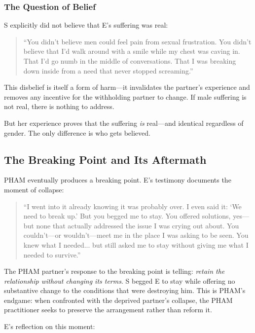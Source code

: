 \documentclass[12pt, letterpaper]{article}
\begin{document}
\subsubsection{The Question of Belief}

S explicitly did not believe that E's suffering was real:

\begin{quote}
``You didn't believe men could feel pain from sexual frustration. You didn't believe that I'd walk around with a smile while my chest was caving in. That I'd go numb in the middle of conversations. That I was breaking down inside from a need that never stopped screaming.''
\end{quote}

This disbelief is itself a form of harm---it invalidates the partner's experience and removes any incentive for the withholding partner to change. If male suffering is not real, there is nothing to address.

But her experience proves that the suffering \textit{is} real---and identical regardless of gender. The only difference is who gets believed.

\subsection{The Breaking Point and Its Aftermath}

PHAM eventually produces a breaking point. E's testimony documents the moment of collapse:

\begin{quote}
``I went into it already knowing it was probably over. I even said it: `We need to break up.' But you begged me to stay. You offered solutions, yes---but none that actually addressed the issue I was crying out about. You couldn't---or wouldn't---meet me in the place I was asking to be seen. You knew what I needed... but still asked me to stay without giving me what I needed to survive.''
\end{quote}

The PHAM partner's response to the breaking point is telling: \textit{retain the relationship without changing its terms}. S begged E to stay while offering no substantive change to the conditions that were destroying him. This is PHAM's endgame: when confronted with the deprived partner's collapse, the PHAM practitioner seeks to preserve the arrangement rather than reform it.

E's reflection on this moment:
\end{document}
